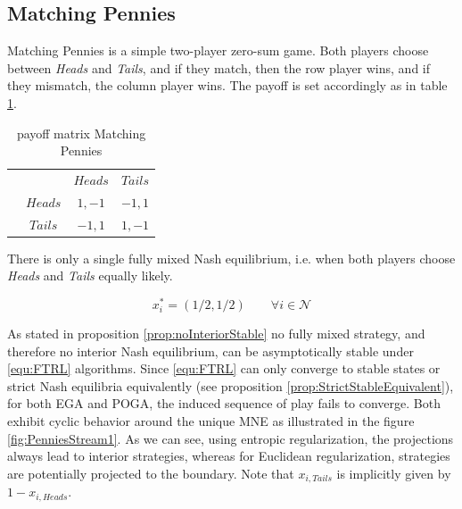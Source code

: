 \subsection{Matching Pennies}\label{subsection:machtingPennies}

Matching Pennies is a simple two-player zero-sum game. Both players choose between \textit{Heads} and \textit{Tails}, and if they match, then the row player wins, and if they mismatch, the column player wins. The payoff is set accordingly as in table \ref{tab:payoffMachtingPennies}. 

\begin{table}[H]\centering
\setlength{\extrarowheight}{2pt}
\begin{tabular}{cc|c|c|}
  & \multicolumn{1}{c}{} & \multicolumn{1}{c}{$Heads$}  & \multicolumn{1}{c}{$Tails$} \\\cline{3-4}
  & $Heads$ & $1,-1$ & $-1,1$ \\\cline{3-4}
  & $Tails$ & $-1,1$ & $1,-1$ \\\cline{3-4}
\end{tabular}\caption{\label{tab:payoffMachtingPennies}payoff matrix Matching Pennies}
\end{table}

There is only a single fully mixed Nash equilibrium, i.e. when both players choose \textit{Heads} and \textit{Tails} equally likely. 

\begin{equation*}
    x_{i}^{*} = (1/2,1/2) \qquad \forall i \in \mathcal{N}
\end{equation*}

As stated in proposition \ref{prop:noInteriorStable} no fully mixed strategy, and therefore no interior Nash equilibrium, can be asymptotically stable under \ref{equ:FTRL} algorithms. Since \ref{equ:FTRL} can only converge to stable states or strict Nash equilibria equivalently (see proposition \ref{prop:StrictStableEquivalent}), for both EGA and POGA, the induced sequence of play fails to converge. Both exhibit cyclic behavior around the unique MNE as illustrated in the figure \ref{fig:PenniesStream1}. As we can see, using entropic regularization, the projections always lead to interior strategies, whereas for Euclidean regularization, strategies are potentially projected to the boundary. Note that $x_{i,Tails}$ is implicitly given by $1 - x_{i,Heads}$.

